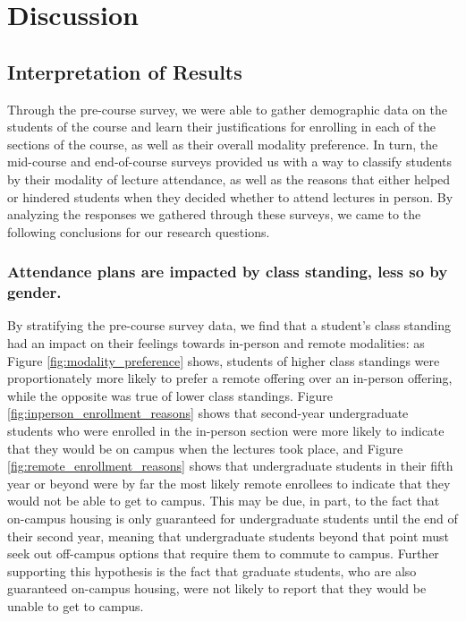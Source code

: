 \chapter{Discussion}

\section{Interpretation of Results}

Through the pre-course survey, we were able to gather demographic data on the students of the course and learn their justifications for enrolling in each of the sections of the course, as well as their overall modality preference. In turn, the mid-course and end-of-course surveys provided us with a way to classify students by their modality of lecture attendance, as well as the reasons that either helped or hindered students when they decided whether to attend lectures in person. By analyzing the responses we gathered through these surveys, we came to the following conclusions for our research questions.

\subsection{Attendance plans are impacted by class standing, less so by gender.}

By stratifying the pre-course survey data, we find that a student's class standing had an impact on their feelings towards in-person and remote modalities: as Figure \ref{fig:modality_preference} shows, students of higher class standings were proportionately more likely to prefer a remote offering over an in-person offering, while the opposite was true of lower class standings. Figure \ref{fig:inperson_enrollment_reasons} shows that second-year undergraduate students who were enrolled in the in-person section were more likely to indicate that they would be on campus when the lectures took place,  and Figure \ref{fig:remote_enrollment_reasons} shows that undergraduate students in their fifth year or beyond were by far the most likely remote enrollees to indicate that they would not be able to get to campus. This may be due, in part, to the fact that on-campus housing is only guaranteed for undergraduate students until the end of their second year, meaning that undergraduate students beyond that point must seek out off-campus options that require them to commute to campus. Further supporting this hypothesis is the fact that graduate students, who are also guaranteed on-campus housing, were not likely to report that they would be unable to get to campus.

